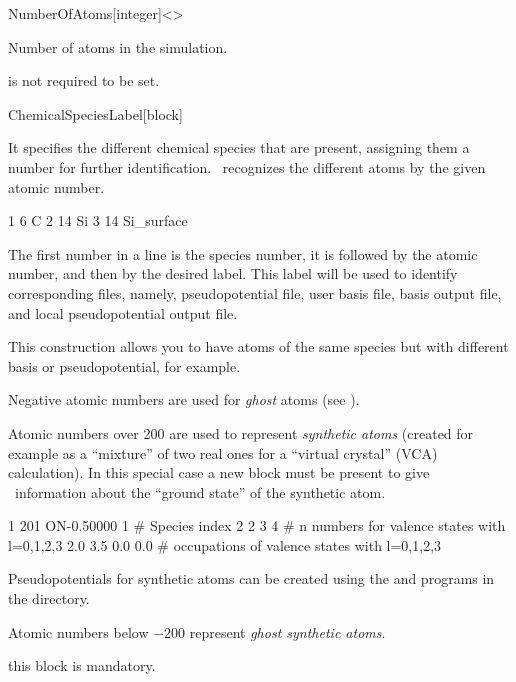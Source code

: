 \begin{fdfentry}{NumberOfAtoms}[integer]<>

  Number of atoms in the simulation.

  \note is not required to be set.

\end{fdfentry}


\begin{fdfentry}{ChemicalSpeciesLabel}[block]

  It specifies the different chemical species that are
  present, assigning them a number for further identification.
  \siesta\ recognizes the different atoms by the given atomic number.

  \begin{fdfexample}
        1   6   C
        2  14   Si
        3  14   Si_surface
  \end{fdfexample}
  The first number in a line is the species number, it is followed by
  the atomic number, and then by the desired label. This label will be
  used to identify corresponding files, namely, pseudopotential file,
  user basis file, basis output file, and local pseudopotential output
  file.

  This construction allows you to have atoms of the same species but
  with different basis or pseudopotential, for example.

  Negative atomic numbers are used for \emph{ghost}
  atoms (see ).

  Atomic numbers over 200 are used to represent \emph{synthetic atoms}
   (created for example as a ``mixture'' of two
  real ones for a ``virtual crystal'' (VCA)
  calculation). In this special case a new  block
  must be present to give \siesta\ information about the ``ground
  state'' of the synthetic atom.

  \begin{fdfexample}
        1   201 ON-0.50000
        1               # Species index
        2 2 3 4         # n numbers for valence states  with l=0,1,2,3
        2.0 3.5 0.0 0.0 # occupations of valence states with l=0,1,2,3
  \end{fdfexample}

  Pseudopotentials for synthetic atoms can be created using the
   and  programs  in the 
  directory.

  Atomic numbers below $-200$ represent \emph{ghost synthetic atoms}.

  \note this block is mandatory.
  
\end{fdfentry}


